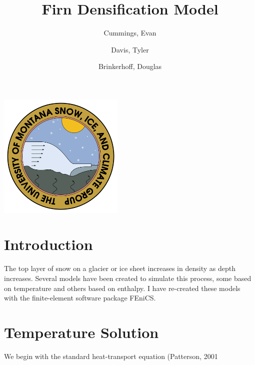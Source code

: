 \documentclass{article}%
\begin{document}

\title{Firn Densification Model}
\author{Cummings, Evan \and Davis, Tyler \and Brinkerhoff, Douglas}
\maketitle
\begin{center}
\includegraphics[width=0.45\textwidth]{images/logo.png}
\end{center}

\twocolumn


\section{Introduction}

The top layer of snow on a glacier or ice sheet increases in density as depth increases.  Several models have been created to simulate this process, some based on temperature and others based on enthalpy.  I have re-created these models with the finite-element software package FEniCS.

\section{Temperature Solution}

We begin with the standard heat-transport equation (Patterson, 2001
\end{document}
